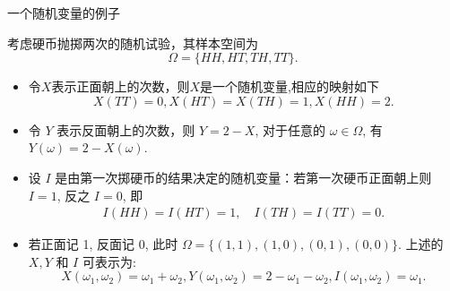 \documentclass[Prob-All.tex]{subfiles}
\begin{document}
\begin{frame}{一个随机变量的例子}
	\begin{exam}\label{312}
		考虑硬币抛掷两次的随机试验，其样本空间为 $$\Omega=\{HH,HT,TH,TT\}.$$ %
		\begin{itemize}[<+-|alert@+>]
			\item 令$X$表示正面朝上的次数，则$X$是一个随机变量,相应的映射如下
			      $$X(TT)=0, X(HT)=X(TH)=1, X(HH)=2.$$
			\item 令 $Y$ 表示反面朝上的次数，则 $Y=2-X$, 对于任意的 $\omega\in \Omega$, 有 $Y (\omega)=2-X (\omega)$.
			\item 设 $I$ 是由第一次掷硬币的结果决定的随机变量：若第一次硬币正面朝上则 $I=1$, 反之 $I=0$, 即
			      \begin{align*}
				      I(HH)=I(HT)=1,\quad I(TH)=I(TT)=0.
			      \end{align*}
			\item 若正面记 1, 反面记 0, 此时 $\Omega=\{(1,1),(1,0),(0,1),(0,0)\}$. 上述的 $X,Y$ 和 $I$ 可表示为:$$X (\omega_1,\omega_2)=\omega_1+\omega_2,Y (\omega_1,\omega_2)=2-\omega_1-\omega_2,I (\omega_1,\omega_2)=\omega_1.$$
		\end{itemize}
	\end{exam}
\end{frame}
\end{document}
